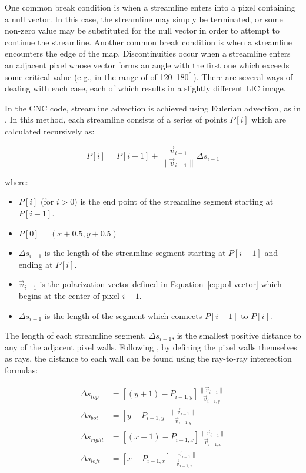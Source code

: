 One common break condition is when a streamline enters into a pixel containing a null vector. In this case, the streamline may simply be terminated, or some non-zero value may be substituted for the null vector in order to attempt to continue the streamline. Another common break condition is when a streamline encounters the edge of the map. Discontinuities occur when a streamline enters an adjacent pixel whose vector forms an angle with the first one which exceeds some critical value (e.g., in the range of of 120--180$^{\degree}$). There are several ways of dealing with each case, each of which results in a slightly different LIC image.

In the CNC code, streamline advection is achieved using Eulerian advection, as in \citet{cabral1993imaging}. In this method, each streamline consists of a series of points $P[i]$ which are calculated recursively as:

\begin{equation}
  P[i] = P[i - 1] + \frac{\vec{v}_{i - 1}}{\lVert \vec{v}_{i - 1} \rVert} \Delta s_{i - 1}
\end{equation}

where:
\begin{itemize}[label={},nosep]
  \item $P[i]$ (for $i > 0$) is the end point of the streamline segment starting at $P[i - 1]$.
  \item $P[0] = (x + 0.5, y + 0.5)$
  \item $\Delta s_{i - 1}$ is the length of the streamline segment starting at $P[i - 1]$ and ending at $P[i]$.
  \item $\vec{v}_{i - 1}$ is the polarization vector defined in Equation~\ref{eq:pol vector} which begins at the center of pixel $i - 1$.
  \item $\Delta s_{i - 1}$ is the length of the segment which connects $P[i - 1]$ to $P[i]$.
\end{itemize}

The length of each streamline segment, $\Delta s_{i - 1}$, is the smallest positive distance to any of the adjacent pixel walls. Following \citet{ma1996texture}, by defining the pixel walls themselves as rays, the distance to each wall can be found using the ray-to-ray intersection formulas:

\begin{align*}
  \Delta s_{top} &= \left[ (y + 1) - P_{i - 1,y} \right] \frac{ \lVert \vec{v}_{i - 1} \rVert }{ \vec{v}_{i - 1,y} } \\
  \Delta s_{bot} &= \left[ y - P_{i - 1,y} \right] \frac{ \lVert \vec{v}_{i - 1} \rVert }{\vec{v}_{i - 1,y} } \\
  \Delta s_{right} &= \left[ (x + 1) - P_{i - 1,x} \right] \frac{ \lVert \vec{v}_{i - 1} \rVert }{ \vec{v}_{i - 1,x} } \\
  \Delta s_{left} &= \left[ x - P_{i - 1,x} \right] \frac{ \lVert \vec{v}_{i - 1} \rVert }{\vec{v}_{i - 1,x}} \\
\end{align*}

